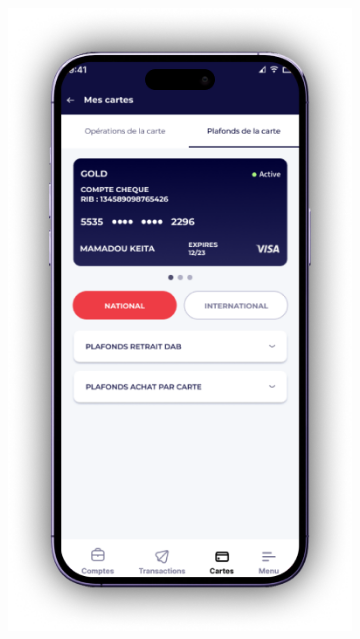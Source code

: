 \begin{figure}[!ht]
    \centering
    \begin{subfigure}[b]{0.49\textwidth}
        \centering
        \includegraphics[width=\textwidth]{images/screens/mobileApp/device/Cards Limits D.png}
    \end{subfigure}
    \begin{subfigure}[b]{0.49\textwidth}
        \centering

\end{subfigure}
\end{figure}

